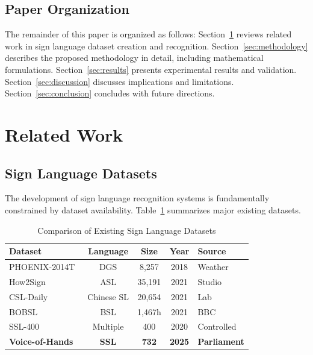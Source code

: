 \documentclass[journal]{IEEEtran}
\begin{document}
\subsection{Paper Organization}

The remainder of this paper is organized as follows: Section~\ref{sec:related} reviews related work in sign language dataset creation and recognition. Section~\ref{sec:methodology} describes the proposed methodology in detail, including mathematical formulations. Section~\ref{sec:results} presents experimental results and validation. Section~\ref{sec:discussion} discusses implications and limitations. Section~\ref{sec:conclusion} concludes with future directions.

\section{Related Work}
\label{sec:related}

\subsection{Sign Language Datasets}

The development of sign language recognition systems is fundamentally constrained by dataset availability. Table~\ref{tab:datasets} summarizes major existing datasets.

\begin{table}[htbp]
\centering
\caption{Comparison of Existing Sign Language Datasets}
\label{tab:datasets}
\begin{tabular}{@{}lcccl@{}}
\toprule
\textbf{Dataset} & \textbf{Language} & \textbf{Size} & \textbf{Year} & \textbf{Source} \\ \midrule
PHOENIX-2014T~\cite{camgoz2018neural} & DGS & 8,257 & 2018 & Weather \\
How2Sign~\cite{duarte2021how2sign} & ASL & 35,191 & 2021 & Studio \\
CSL-Daily~\cite{zhou2021improving} & Chinese SL & 20,654 & 2021 & Lab \\
BOBSL~\cite{albanie2021bobsl} & BSL & 1,467h & 2021 & BBC \\
SSL-400~\cite{adaloglou2022comprehensive} & Multiple & 400 & 2020 & Controlled \\
\textbf{Voice-of-Hands} & \textbf{SSL} & \textbf{732} & \textbf{2025} & \textbf{Parliament} \\
\bottomrule
\end{tabular}
\end{table}
\end{document}
